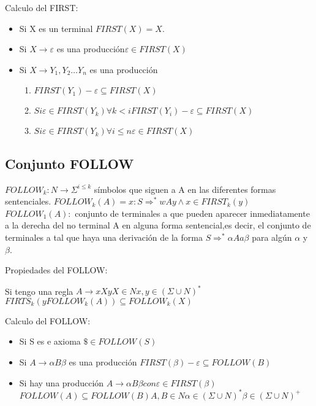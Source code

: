 Calculo del FIRST:
\begin{itemize}
	\item Si X es un terminal $FIRST(X)={X}$.
	\item Si $X\rightarrow\varepsilon$ es una producción$\varepsilon\in FIRST(X)$
	\item Si $X\rightarrow Y_{1},Y_{2}\ldots Y_{n}$ es una producción
	\begin{enumerate}
		\item $FIRST(Y_{1})-{\varepsilon}\subseteq FIRST(X)$
		\item $Si \varepsilon\in FIRST(Y_{k})\forall k<i FIRST(Y_{i})-{\varepsilon}\subseteq FIRST(X) $
		\item $Si \varepsilon\in FIRST(Y_{k})\forall i\leq n \varepsilon \in FIRST(X) $
	\end{enumerate}
\end{itemize}

\subsection{Conjunto FOLLOW}
$FOLLOW_{k}:N\rightarrow\Sigma^{i\leq k}$ símbolos que siguen  a A en las diferentes formas sentenciales.
$FOLLOW_{k}(A)={x:S\Rightarrow^{*}wAy \wedge x\in FIRST_{k}(y)}$
$FOLLOW_{1}(A):$ conjunto de terminales a que pueden aparecer inmediatamente a la derecha del no terminal A en alguna forma sentencial,es decir, el conjunto de terminales a tal que haya una derivación de la forma $S\Rightarrow^{*}\alpha Aa\beta$ para algún $\alpha$ y  $\beta$.

Propiedades del FOLLOW:

Si tengo una regla $A\rightarrow xXy  X\in N  x,y\in(\Sigma\cup N)^{*}$
$FIRTS_{k}(y FOLLOW_{k}(A))\subseteq FOLLOW_{k}(X)$

Calculo del FOLLOW:
\begin{itemize}
	\item Si S es e axioma $\$\in FOLLOW(S)$
	\item Si $A\rightarrow\alpha B\beta$ es una producción $FIRST(\beta)-{\varepsilon}\subseteq FOLLOW(B)$
	\item Si hay una producción $A\rightarrow\alpha B\beta con \varepsilon\in FIRST(\beta)$
	$FOLLOW(A)\subseteq FOLLOW(B)  A,B\in N  \alpha\in(\Sigma\cup N)^{*}  \beta\in(\Sigma\cup N)^{+}$
\end{itemize}

	
